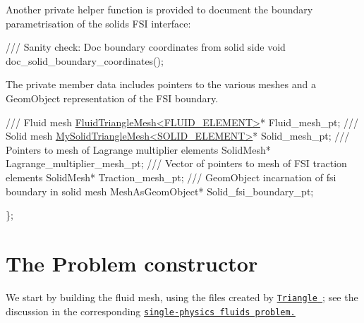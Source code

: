 Another private helper function is provided to document the boundary parametrisation of the solid\textquotesingle{}s F\+SI interface\+:


\begin{DoxyCodeInclude}
\textcolor{comment}{}
\textcolor{comment}{ /// Sanity check: Doc boundary coordinates from solid side}
\textcolor{comment}{} \textcolor{keywordtype}{void} doc\_solid\_boundary\_coordinates();

\end{DoxyCodeInclude}


The private member data includes pointers to the various meshes and a {\ttfamily Geom\+Object} representation of the F\+SI boundary.


\begin{DoxyCodeInclude}
 \textcolor{comment}{}
\textcolor{comment}{ /// Fluid mesh}
\textcolor{comment}{} \hyperlink{classFluidTriangleMesh}{FluidTriangleMesh<FLUID\_ELEMENT>}* Fluid\_mesh\_pt;
\textcolor{comment}{}
\textcolor{comment}{ /// Solid mesh}
\textcolor{comment}{} \hyperlink{classMySolidTriangleMesh}{MySolidTriangleMesh<SOLID\_ELEMENT>}* Solid\_mesh\_pt;
\textcolor{comment}{}
\textcolor{comment}{ /// Pointers to mesh of Lagrange multiplier elements}
\textcolor{comment}{} SolidMesh* Lagrange\_multiplier\_mesh\_pt;
\textcolor{comment}{}
\textcolor{comment}{ /// Vector of pointers to mesh of FSI traction elements}
\textcolor{comment}{} SolidMesh* Traction\_mesh\_pt;
\textcolor{comment}{}
\textcolor{comment}{ /// GeomObject incarnation of fsi boundary in solid mesh}
\textcolor{comment}{} MeshAsGeomObject* 
 Solid\_fsi\_boundary\_pt;

\}; 

\end{DoxyCodeInclude}




 

\hypertarget{index_constructor}{}\section{The Problem constructor}\label{index_constructor}
We start by building the fluid mesh, using the files created by \href{http://www.cs.cmu.edu/~quake/triangle.html}{\tt {\ttfamily Triangle} }; see the discussion in the corresponding \href{../../../navier_stokes/unstructured_fluid/html/index.html#mesh}{\tt single-\/physics fluids problem.}


